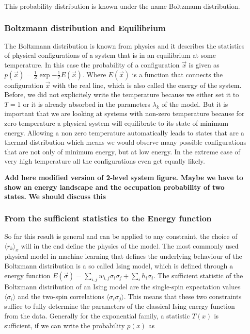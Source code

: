 \documentclass[nofootinbib, superscriptaddress, prl]{revtex4}
\begin{document}
This probability distribution is known under the name Boltzmann distribution.

\subsubsection{Boltzmann distribution and Equilibrium}

The Boltzmann distribution is known from physics and it describes the statistics of physical configurations of a system that is in an equilibrium at some temperature. In this case the probability of a configuration $\vec{x}$ is given as $p(\vec{x}) = \frac{1}{Z} \exp{- \frac{1}{T} E(\vec{x})}$. Where $E(\vec{x})$ is a function that connects the configuration $\vec{x}$ with the real line, which is also called the energy of the system. Before, we did not explicitely write the temperature because we either set it to $T=1$ or it is already absorbed in the parameters $\lambda_k$ of the model. But it is important that we are looking at systems with non-zero temperature because for zero temperature a physical system will equilibrate to its state of minimum energy. Allowing a non zero temperature automatically leads to states that are a thermal distribution which means we would observe many possible configurations that are not only of minimum energy, but at low energy. In the extreme case of very high temperature all the configurations even get equally likely.  

\textbf{Add here modified version of 2-level system figure. Maybe we have to show an energy landscape and the occupation probability of two states. We should discuss this}

\subsubsection{From the sufficient statistics to the Energy function}

So far this result is general and can be applied to any constraint, the choice of $\langle r_k \rangle_x$ will in the end define the physics of the model. The most commonly used physical model in machine learning that defines the underlying behaviour of the Boltzmann distribution is a so called Ising model, which is defined through a energy function $E(\vec {\sigma}) = \sum_{i,j} w_{i,j} \sigma_i \sigma_j + \sum_i h_i \sigma_i$. 
The sufficient statistic of the Boltzmann distribution of an Ising model are the single-spin expectation values $\langle \sigma_i \rangle$ and the two-spin correlations $\langle \sigma_i \sigma_j \rangle$. This means that these two constraints suffice to fully determine the parameters of the classical Ising energy function from the data.
Generally for the exponential family, a statistic $T(x)$ is sufficient, if we can write the probability $p(x)$ as
\end{document}
